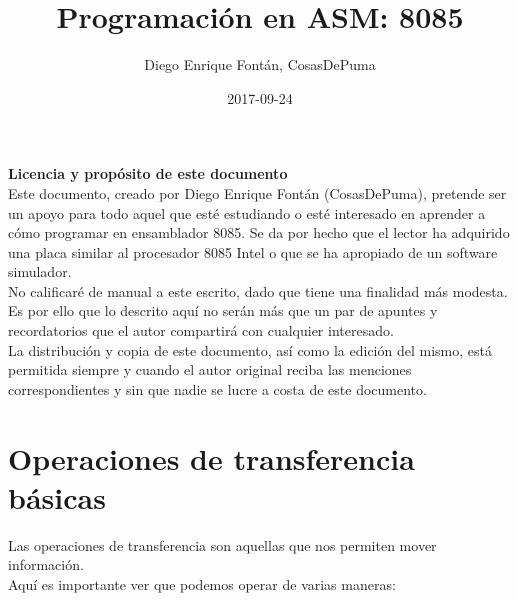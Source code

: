 \documentclass[12pt]{article}
\title{\textbf{Programación en ASM: 8085}}
\date{2017-09-24}
\author{Diego Enrique Fontán, CosasDePuma}
\begin{document}
	\maketitle
	
	\newpage
	
	\tableofcontents
	
	\newpage
	
	
	
	\textbf{Licencia y propósito de este documento}\\
	
	Este documento, creado por Diego Enrique Fontán (CosasDePuma), pretende ser un apoyo para todo aquel que esté estudiando o esté interesado en aprender a cómo programar en ensamblador 8085. Se da por hecho que el lector ha adquirido una placa similar al procesador 8085 Intel o que se ha apropiado de un software simulador.\\
	
	No calificaré de manual a este escrito, dado que tiene una finalidad más modesta. Es por ello que lo descrito aquí no serán más que un par de apuntes y recordatorios que el autor compartirá con cualquier interesado.\\
	
	La distribución y copia de este documento, así como la edición del mismo, está permitida siempre y cuando el autor original reciba las menciones correspondientes y sin que nadie se lucre a costa de este documento.\\
	
	\newpage
	
	\section{Operaciones de transferencia básicas}
	
		Las operaciones de transferencia son aquellas que nos permiten mover información.\\
		
		Aquí es importante ver que podemos operar de varias maneras:\\
	
	
\end{document}
